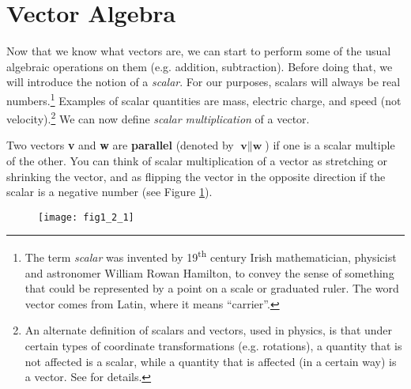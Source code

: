 \section{Vector Algebra}
Now that we know what vectors are, we can start to perform some of the usual algebraic operations on them (e.g.
addition, subtraction). Before doing that, we will introduce the notion of a \emph{scalar}.
For our purposes, scalars will always be real numbers.\footnote{The term \emph{scalar} was invented by
19\textsuperscript{th} century
Irish mathematician, physicist and astronomer William Rowan Hamilton, to convey the sense of something
that could be represented by a point
on a scale or graduated ruler. The word vector comes from Latin, where it means ``carrier''.} Examples of
scalar quantities are mass, electric charge, and speed (not velocity).\footnote{An alternate definition of
scalars and vectors, used in physics, is that under certain types of coordinate transformations (e.g. rotations), a
quantity that is not affected is a scalar, while a quantity that is affected (in a certain way) is a vector.
See \cite{mar} for details.}
We can now define \emph{scalar multiplication} of a vector.


Two vectors \textbf{v} and \textbf{w} are \textbf{parallel} (denoted by $\textbf{v} \parallel
\textbf{w}$) if one is a scalar multiple of the other.
You can think of scalar multiplication of a vector as stretching or shrinking
the vector, and as flipping the vector in the opposite direction if the scalar is a negative number
(see Figure \ref{fig:scalar}).

\begin{figure}[h]
 \begin{center}
  \texttt{[image: fig1\_2\_1]}\vspace{-3mm}
 \end{center}
 \caption[]{}
 \label{fig:scalar}
\end{figure}\vspace{-2mm}

